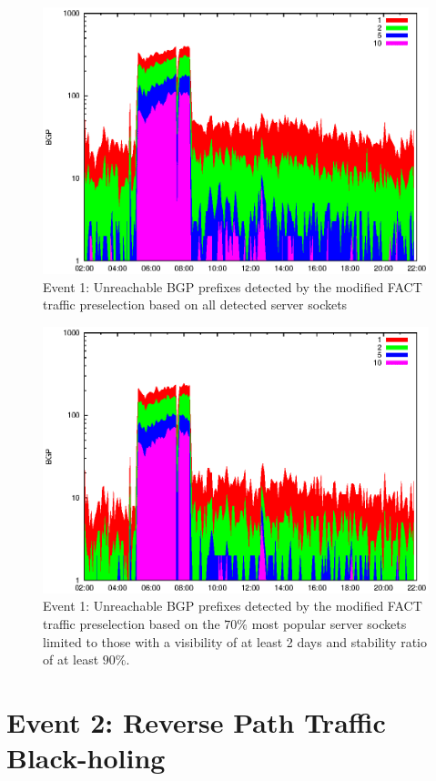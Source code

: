 \begin{figure}
	[p] \centering 
	\includegraphics[width=0.75\linewidth]{images/events/2010_03_25/bgp_log_all_external.eps}
	\caption{Event 1: Unreachable BGP prefixes detected by the modified FACT traffic preselection based on all detected server sockets} 
	\label{fig:AMS_IX_FACT_allSES} 
\end{figure}

\begin{figure}
	[p] \centering 
	\includegraphics[width=0.75\linewidth]{images/events/2010_03_25/bgp_log_Set_var_0_1_stab_9_vts_2.eps}
	\caption{Event 1: Unreachable BGP prefixes detected by the modified FACT traffic preselection based on the $70\%$ most popular server sockets limited to those with a visibility of at least 2 days and stability ratio of at least $90\%$.} 
	\label{fig:AMS_IX_FACT_popularVTS2STAB9} 
\end{figure}


\newpage
\section{Event 2: Reverse Path Traffic Black-holing}

